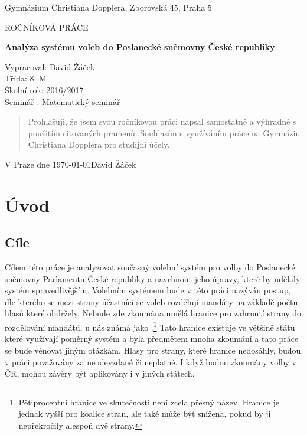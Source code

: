 \documentclass[12pt]{report}
\begin{document}
\begin{titlepage}
	\begin{center}
	{\large Gymnázium Christiana Dopplera, Zborovská 45, Praha 5 \par}
	\vfill
	\par\vspace{1cm}
	{\scshape\LARGE ROČNÍKOVÁ PRÁCE \par}
	{\huge\bfseries Analýza systému voleb do Poslanecké sněmovny České republiky\par}
	\vfill
\end{center}
	\vfill
Vypracoval: David Žáček \\
Třída: 8. M \\
Školní rok: 2016/2017 \\
Seminář : Matematický seminář \\

\end{titlepage}

\vspace*{\fill}
\begin{quote}
Prohlašuji, že jsem svou ročníkovou práci napsal samostatně a výhradně s
použitím 
citovaných pramenů. Souhlasím s
využíváním 
práce na Gymnáziu Christiana Dopplera 
pro studijní účely. \\
\end{quote}

V Praze dne \today \hfill David Žáček

\vspace*{\fill}
\thispagestyle{empty}
\newpage
\tableofcontents
\newpage
\chapter{Úvod}
\section{Cíle}
Cílem této práce je analyzovat současný volební systém pro volby do Poslanecké sněmovny Parlamentu České republiky a navrhnout jeho úpravy, které by udělaly systém spravedlivějším.
Volebním systémem bude v této práci nazýván postup, dle kterého se mezi strany účastnící se voleb rozdělují mandáty na základě počtu hlasů které obdržely.
Nebude zde zkoumána umělá hranice pro zahrnutí strany do rozdělování mandátů, u nás známá jako .\footnote{Pětiprocentní hranice ve skutečnosti není zcela přesný název.
Hranice je jednak vyšší pro koalice stran, ale také může být snížena, pokud by ji nepřekročily alespoň dvě strany.\autocite{ZAK}}
Tato hranice existuje ve většině států které využívají poměrný systém a byla předmětem mnoha zkoumání a tato práce se bude věnovat jiným otázkám.
Hlasy pro strany, které hranice nedosáhly, budou v práci považovány za neodevzdané či neplatné.
I když budou zkoumány volby v ČR, mohou závěry být aplikovány i v jiných státech.
\end{document}
